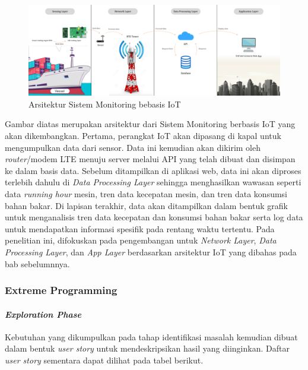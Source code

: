 \begin{figure}[!h]
    \includegraphics[width=1\linewidth, center]{images/metode/fig-system-archi.png}
    \caption{Arsitektur Sistem Monitoring bebasis IoT}
    \label{fig:system-archi}
\end{figure}

Gambar diatas merupakan arsitektur dari Sistem Monitoring berbasis IoT yang akan dikembangkan. Pertama, perangkat IoT akan dipasang di kapal untuk mengumpulkan data dari sensor. Data ini kemudian akan dikirim oleh \textit{router}/modem LTE menuju server melalui API yang telah dibuat dan disimpan ke dalam basis data. Sebelum ditampilkan di aplikasi web, data ini akan diproses terlebih dahulu di \textit{Data Processing Layer} sehingga menghasilkan wawasan seperti data \textit{running hour} mesin, tren data kecepatan mesin, dan tren data konsumsi bahan bakar. Di lapisan terakhir, data akan ditampilkan dalam bentuk grafik untuk menganalisis tren data kecepatan dan konsumsi bahan bakar serta log data untuk mendapatkan informasi spesifik pada rentang waktu tertentu. Pada penelitian ini, difokuskan pada pengembangan untuk \textit{Network Layer}, \textit{Data Processing Layer}, dan \textit{App Layer} berdasarkan arsitektur IoT yang dibahas pada bab sebelumnnya.

\subsubsection{Extreme Programming}

\paragraph{\textit{Exploration Phase}}

    Kebutuhan yang dikumpulkan pada tahap identifikasi masalah kemudian dibuat dalam bentuk \textit{user story} untuk mendeskripsikan hasil yang diinginkan. Daftar \textit{user story} sementara dapat dilihat pada tabel berikut.

    \newpage

